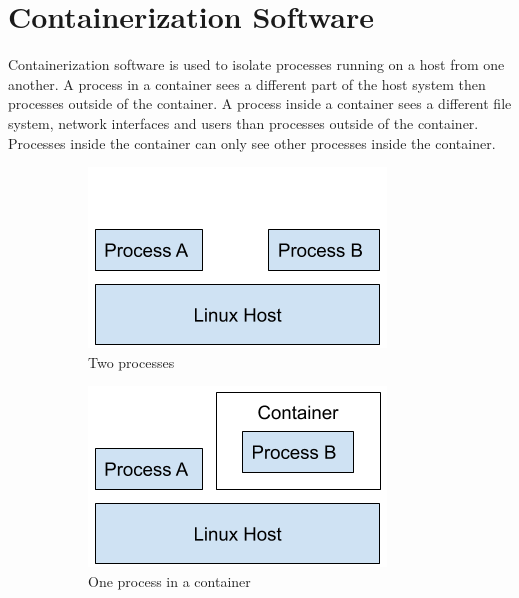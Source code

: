 \section{Containerization Software}
Containerization software is used to isolate processes running on a host from one another.
A process in a container sees a different part of the host system then processes outside of the container. A process inside a container sees a different file system, network interfaces and users than processes outside of the container. Processes inside the container can only see other processes inside the container.

\begin{figure}[ht]
    \begin{subfigure}{.45\textwidth}
        \centering
        \includegraphics[width=.8\linewidth]{resources/images/no-containers.png}
        \caption{Two processes}
    \end{subfigure}
    \begin{subfigure}{.45\textwidth}
        \centering
        \includegraphics[width=.8\linewidth]{resources/images/container.png}
        \caption{One process in a container}
    \end{subfigure}
    \caption{}
\end{figure}

